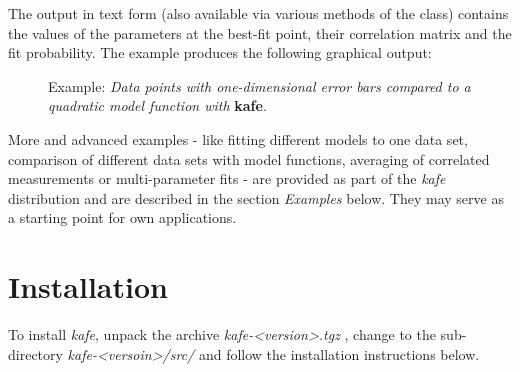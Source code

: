 \documentclass[a4paper,10pt,english]{sphinxmanual}
\begin{document}
The output in text form (also available via various  methods
of the  class) contains the values of the parameters at the best-fit
point, their correlation matrix and the fit probability. The example produces
the following graphical output:
\begin{figure}[htbp]
\centering
\capstart

\caption{Example: \emph{Data points with one-dimensional error bars compared
to a quadratic model function with} \textbf{kafe}.}\end{figure}

More and advanced examples - like fitting different models
to one data set, comparison of different data sets with model
functions, averaging of correlated measurements or multi-parameter
fits - are provided as part of the \emph{kafe} distribution and are
described in the section \emph{Examples} below. They may serve as
a starting point for own applications.


\section{Installation}
\label{index:installation}
To install \emph{kafe}, unpack the archive \emph{kafe-\textless{}version\textgreater{}.tgz} , change to
the sub-directory  \emph{kafe-\textless{}versoin\textgreater{}/src/}  and follow the installation
instructions below.
\end{document}
